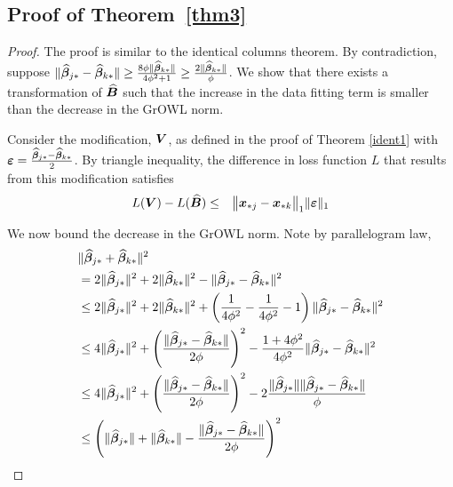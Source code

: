 \subsection*{Proof of Theorem~\ref{thm3}}
\begin{proof}
The proof is similar to the identical columns theorem. By contradiction, suppose $\|\widehat {\boldsymbol{\beta}}_{j {\ast}} - \widehat {\boldsymbol{\beta}}_{k {\ast}}\| \geq \frac{8\phi \|\widehat {\boldsymbol{\beta}}_{k {\ast}}\|}{4\phi^2+1}  \geq \frac{2 \|\widehat {\boldsymbol{\beta}}_{k {\ast}}\|}{\phi}$. We show that there exists a transformation of $\widehat{\boldsymbol{B}}$ such that the increase in the data fitting term is smaller than the decrease in the GrOWL norm. 

Consider the modification, $\boldsymbol{V}$, as defined in the proof of Theorem \ref{ident1} with $\boldsymbol{\varepsilon} = \frac{\widehat {\boldsymbol{\beta}}_{j {\ast}} - \widehat {\boldsymbol{\beta}}_{k {\ast}}}{2}$. By triangle inequality, the difference in loss function $L$ that results from this modification satisfies
\begin{eqnarray*}
L(\bm V) - L(\widehat{\bm B})  & \leq  & \bigl\|{\bm x}_{{\ast} j}- {\bm x}_{{\ast} k}\bigr\|_1  \|\boldsymbol{\varepsilon} \|_1  
\end{eqnarray*}

We now bound the decrease in the GrOWL norm. Note by parallelogram law, 
\begin{align*}
 & \|\widehat {\boldsymbol{\beta}}_{j {\ast}} + \widehat {\boldsymbol{\beta}}_{k {\ast}}\|^2 \\
 & = 2\|\widehat {\boldsymbol{\beta}}_{j {\ast}}\|^2 + 2\| \widehat {\boldsymbol{\beta}}_{k {\ast}}\|^2 -  \|\widehat {\boldsymbol{\beta}}_{j {\ast}} - \widehat {\boldsymbol{\beta}}_{k {\ast}} \|^2\\
 & \leq 2\|\widehat {\boldsymbol{\beta}}_{j {\ast}}\|^2 + 2\| \widehat {\boldsymbol{\beta}}_{k {\ast}}\|^2 + \left( \frac{1}{4\phi^2} - \frac{1}{4\phi^2} -1 \right) \|\widehat {\boldsymbol{\beta}}_{j {\ast}} - \widehat {\boldsymbol{\beta}}_{k {\ast}} \|^2 \\
 & \leq 4\|\widehat {\boldsymbol{\beta}}_{j {\ast}}\|^2 + \left(  \frac{ \|\widehat {\boldsymbol{\beta}}_{j {\ast}} - \widehat {\boldsymbol{\beta}}_{k {\ast}} \|}{2\phi} \right)^2  - \frac{1 + 4\phi^2}{4\phi^2} \|\widehat {\boldsymbol{\beta}}_{j {\ast}} - \widehat {\boldsymbol{\beta}}_{k {\ast}} \|^2\\
 & \leq 4\|\widehat {\boldsymbol{\beta}}_{j {\ast}}\|^2 + \left(  \frac{ \|\widehat {\boldsymbol{\beta}}_{j {\ast}} - \widehat {\boldsymbol{\beta}}_{k {\ast}} \|}{2\phi} \right)^2 -  2  \frac{ \|\widehat {\boldsymbol{\beta}}_{j {\ast}}\| \|\widehat {\boldsymbol{\beta}}_{j {\ast}} - \widehat {\boldsymbol{\beta}}_{k {\ast}} \|}{\phi} \\
 & \leq \left( \|\widehat {\boldsymbol{\beta}}_{j {\ast}}\| + \| \widehat {\boldsymbol{\beta}}_{k {\ast}}\| -  \frac{ \|\widehat {\boldsymbol{\beta}}_{j {\ast}} - \widehat {\boldsymbol{\beta}}_{k {\ast}} \|}{2\phi} \right)^2
 \end{align*}
 

\end{proof}

